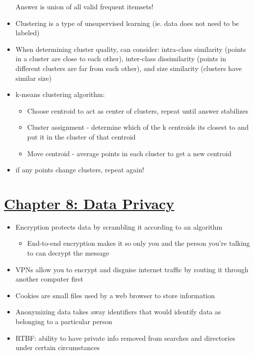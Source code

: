 \documentclass[8pt,landscape,a4paper, fleqn, dvipsnames]{extarticle}
\begin{document}
\begin{multicols*}{4}
\begin{itemize}
Answer is union of all valid frequent itemsets!

    \item Clustering is a type of unsupervised learning (ie. data does not need to be labeled)
    \item When determining cluster quality, can consider: intra-class similarity (points in a cluster are close to each other), inter-class dissimilarity (points in different clusters are far from each other), and size similarity (clusters have similar size)
    \item k-means clustering algorithm:
    \begin{itemize}
        \item Choose centroid to act as center of clusters, repeat until answer stabilizes
        \item Cluster assignment - determine which of the k centroids its closest to and put it in the cluster of that centroid
        \item Move centroid - average points in each cluster to get a new centroid 
    \end{itemize}
    \item if any points change clusters, repeat again!
\end{itemize}

\section*{\ul{Chapter 8: Data Privacy}}
\begin{itemize}
    \item Encryption protects data by scrambling it according to an algorithm
    \begin{itemize}
        \item End-to-end encryption makes it so only you and the person you're talking to can decrypt the message
    \end{itemize}
    \item VPNs allow you to encrypt and disguise internet traffic by routing it through another computer first
    \item Cookies are small files used by a web browser to store information
    \item Anonymizing data takes away identifiers that would identify data as belonging to a particular person
    \item RTBF: ability to have private info removed from searches and directories under certain circumstances
    \end{itemize}
    
\end{multicols*}
\end{document}
